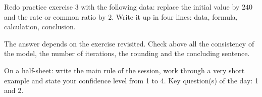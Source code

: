 
\begin{homework}Redo practice exercise 3 with the following data: replace the initial value by $240$ and the rate or common ratio by $2$. Write it up in four lines: data, formula, calculation, conclusion.\end{homework}
\begin{solution}The answer depends on the exercise revisited. Check above all the consistency of the model, the number of iterations, the rounding and the concluding sentence.\end{solution}

\begin{exitticket}[3 minutes]On a half-sheet: write the main rule of the session, work through a very short example and state your confidence level from 1 to 4. Key question(s) of the day: 1 and 2.\end{exitticket}

